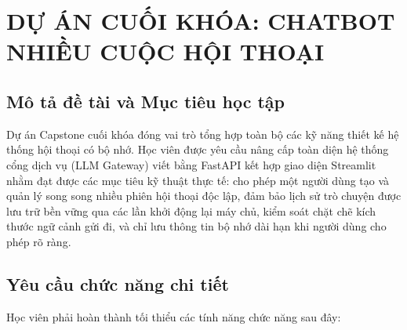 \chapter{DỰ ÁN CUỐI KHÓA: CHATBOT NHIỀU CUỘC HỘI THOẠI}
\label{chap:capstone}

\section{Mô tả đề tài và Mục tiêu học tập}

Dự án Capstone cuối khóa đóng vai trò tổng hợp toàn bộ các kỹ năng thiết kế hệ thống hội thoại có bộ nhớ. Học viên được yêu cầu nâng cấp toàn diện hệ thống cổng dịch vụ (LLM Gateway) viết bằng FastAPI kết hợp giao diện Streamlit nhằm đạt được các mục tiêu kỹ thuật thực tế: cho phép một người dùng tạo và quản lý song song nhiều phiên hội thoại độc lập, đảm bảo lịch sử trò chuyện được lưu trữ bền vững qua các lần khởi động lại máy chủ, kiểm soát chặt chẽ kích thước ngữ cảnh gửi đi, và chỉ lưu thông tin bộ nhớ dài hạn khi người dùng cho phép rõ ràng.

\section{Yêu cầu chức năng chi tiết}

Học viên phải hoàn thành tối thiểu các tính năng chức năng sau đây:

